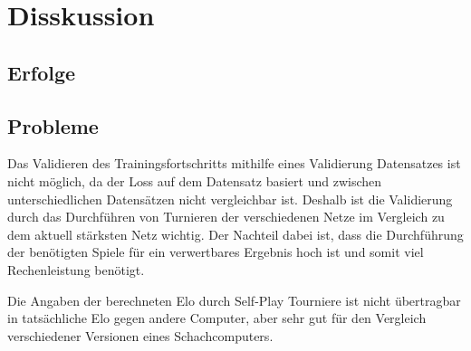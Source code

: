 \chapter{Disskussion}

\section{Erfolge}

\section{Probleme}

Das Validieren des Trainingsfortschritts mithilfe eines Validierung Datensatzes ist nicht möglich, da der Loss auf dem Datensatz basiert und zwischen unterschiedlichen Datensätzen nicht vergleichbar ist. Deshalb ist die Validierung durch das Durchführen von Turnieren der verschiedenen Netze im Vergleich zu dem aktuell stärksten Netz wichtig. Der Nachteil dabei ist, dass die Durchführung der benötigten Spiele für ein verwertbares Ergebnis hoch ist und somit viel Rechenleistung benötigt.

Die Angaben der berechneten Elo durch Self-Play Tourniere ist nicht übertragbar in tatsächliche Elo gegen andere Computer, aber sehr gut für den Vergleich verschiedener Versionen eines Schachcomputers.



